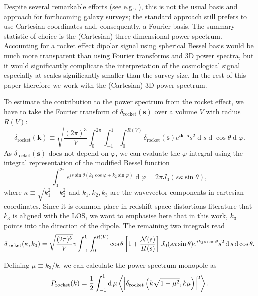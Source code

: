 \documentclass[a4paper,11pt]{article}
\renewcommand{\d}{\operatorname{d}}
\begin{document}
Despite several remarkable efforts (see e.g., \cite{Wang:2020wsx}), this is not the usual basis and approach for forthcoming galaxy surveys; the standard approach still prefers to use Cartesian coordinates and, consequently, a Fourier basis. The summary statistic of choice is the  (Cartesian) three-dimensional power spectrum. Accounting for a rocket effect dipolar signal using spherical Bessel basis would be much more transparent than using Fourier transforms and 3D power spectra, but it would significantly complicate the interpretation of the cosmological signal especially at scales significantly smaller than the survey size. 
 In the rest of this paper therefore we work with the  (Cartesian) 3D power spectrum.
 
To estimate the  contribution to the power spectrum from the rocket effect, we have to take the Fourier transform of $\delta_\mathrm{rocket}(\mathbf{s})$ over a volume $V$ with radius $R(V)$:
\begin{equation}
    \delta_\mathrm{rocket}(\mathbf{k})\equiv \sqrt{\frac{(2\pi)^{3}}{V}}\int_0^{2\pi}\int_{-1}^1\int_0^{R(V)} \delta_\mathrm{rocket}(\mathbf{s})e^{i\mathbf{k\cdot s}}s^2\d s\d\cos\theta\d\varphi.
\end{equation}
As $\delta_\mathrm{rocket}(\mathbf{s})$ does not depend on $\varphi$, we can evaluate the $\varphi$-integral using the integral representation of the modified Bessel function
\begin{equation}
    \int_0^{2\pi}e^{is\sin\theta(k_1\cos\varphi+k_2\sin\varphi)}\d\varphi=2\pi J_0(s\kappa\sin\theta),
\end{equation}
where $\kappa\equiv\sqrt{k_1^2+k_2^2}$ and $k_1, k_2, k_3$ are the wavevector components in cartesian coordinates. Since it is common-place in redshift space distortions literature that $k_3$ is aligned with the LOS, we want to emphasise here that in this work, $k_3$ points into the direction of the dipole. The remaining two integrals read
\begin{equation}
    \delta_\mathrm{rocket}(\kappa,k_3)=\sqrt{\frac{(2\pi)^{5}}{V}} v\int_{-1}^1\int_0^{R(V)} \cos\theta \left[ 1  + \frac{{\cal N}(s)}{H(s)}\right] J_0(s\kappa\sin\theta)e^{ik_3s\cos\theta}s^2\d s\d\cos\theta.
    \label{eq:deltarocketz}
\end{equation}

Defining $\mu \equiv k_3/k$, we can calculate the power spectrum monopole as
\begin{equation}
    P_\mathrm{rocket}(k) = \frac{1}{2}\int_{-1}^1\d\mu\left\langle\left\vert \delta_\mathrm{rocket}\left(k\sqrt{1-\mu^2}, k\mu\right) \right\vert^2\right\rangle.\\
    \label{eq:Pk_rocket}
\end{equation}
\end{document}
